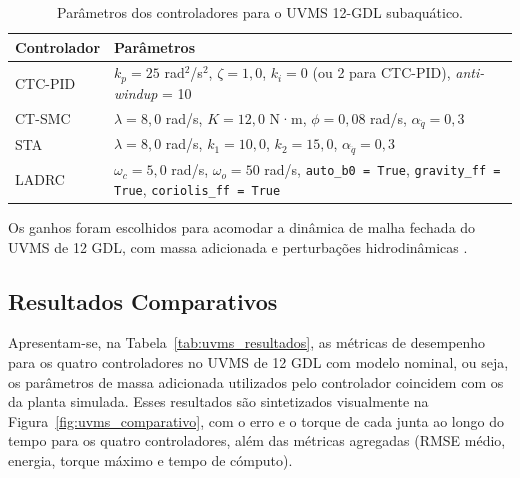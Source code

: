 \begin{table}[h!]
\centering
\caption{Parâmetros dos controladores para o UVMS 12-GDL subaquático.}
\label{tab:uvms_ctrl}
\begin{tabular}{p{2.5cm} p{10.5cm}}
\hline
\textbf{Controlador} & \textbf{Parâmetros} \\
\hline
CTC-PID & $k_p = 25$ rad$^2$/s$^2$, $\zeta = 1{,}0$, $k_i = 0$ (ou 2 para CTC-PID), \textit{anti-windup} = 10 \\
CT-SMC  & $\lambda = 8{,}0$ rad/s, $K = 12{,}0$ N·m, $\phi = 0{,}08$ rad/s, $\alpha_{\ddot{q}} = 0{,}3$ \\
STA     & $\lambda = 8{,}0$ rad/s, $k_1 = 10{,}0$, $k_2 = 15{,}0$, $\alpha_{\ddot{q}} = 0{,}3$ \\
LADRC   & $\omega_c = 5{,}0$ rad/s, $\omega_o = 50$ rad/s, \texttt{auto\_b0 = True}, \texttt{gravity\_ff = True}, \texttt{coriolis\_ff = True} \\
\hline
\end{tabular}
\end{table}

Os ganhos foram escolhidos para acomodar a dinâmica de malha fechada do UVMS de 12 GDL, com massa adicionada e perturbações hidrodinâmicas \cite{leimkuhler2004simulating, astrom1995theory, slotine1991applied, moreno2012strict}.

\subsection{Resultados Comparativos}
\label{sec:uvms_resultados}

Apresentam-se, na Tabela~\ref{tab:uvms_resultados}, as métricas de desempenho para os quatro controladores no UVMS de 12 GDL com modelo nominal, ou seja, os parâmetros de massa adicionada utilizados pelo controlador coincidem com os da planta simulada. Esses resultados são sintetizados visualmente na Figura~\ref{fig:uvms_comparativo}, com o erro e o torque de cada junta ao longo do tempo para os quatro controladores, além das métricas agregadas (RMSE médio, energia, torque máximo e tempo de cómputo).

